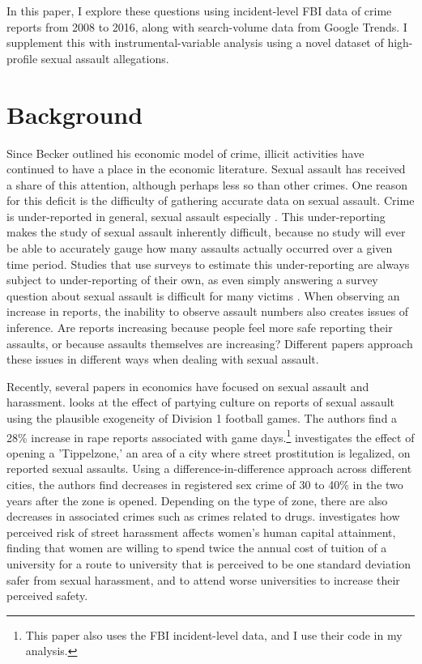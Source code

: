 \documentclass[AER,draftmode]{AEA}
\begin{document}
In this paper, I explore these questions using incident-level FBI data of crime reports from 2008 to 2016, along with search-volume data from Google Trends. I supplement this  with instrumental-variable analysis using a novel dataset of high-profile sexual assault allegations. 

\section{Background}

Since Becker outlined his economic model of crime, illicit activities have continued to have a place in the economic literature. Sexual assault has received a share of this attention, although perhaps less so than other crimes. One reason for this deficit is the difficulty of gathering accurate data on sexual assault. Crime is under-reported in general, sexual assault especially \cite{fisher_sexual_2000}. This under-reporting makes the study of sexual assault inherently difficult, because no study will ever be able to accurately gauge how many assaults actually occurred over a given time period. Studies that use surveys to estimate this under-reporting are always subject to under-reporting of their own, as even simply answering a survey question about sexual assault is difficult for many victims \cite{du_mont_role_2003}. When observing an increase in reports, the inability to observe assault numbers also creates issues of inference. Are reports increasing because people feel more safe reporting their assaults, or because assaults themselves are increasing? Different papers approach these issues in different ways when dealing with sexual assault.

Recently, several papers in economics have focused on sexual assault and harassment.  looks at the effect of partying culture on reports of sexual assault using the plausible exogeneity of Division 1 football games. The authors find a 28\% increase in rape reports associated with game days.\footnote{This paper also uses the FBI incident-level data, and I use their code in my analysis.}  investigates the effect of opening a 'Tippelzone,' an area of a city where street prostitution is legalized, on reported sexual assaults. Using a difference-in-difference approach across different cities, the authors find decreases in registered sex crime of 30 to 40\% in the two years after the zone is opened. Depending on the type of zone, there are also decreases in associated crimes such as crimes related to drugs.  investigates how perceived risk of street harassment affects women's human capital attainment, finding that women are willing to spend twice the annual cost of tuition of a university for a route to university that is perceived to be one standard deviation safer from sexual harassment, and to attend worse universities to increase their perceived safety.
\end{document}
